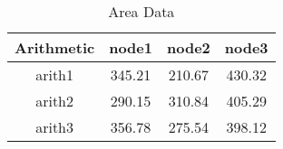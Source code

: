 \begin{table}[h]
\centering
\begin{tabular}{|c|c|c|c|}
\hline
Arithmetic & node1 & node2 & node3\\ \hline
arith1 & 345.21 & 210.67 & 430.32\\ \hline
arith2 & 290.15 & 310.84 & 405.29\\ \hline
arith3 & 356.78 & 275.54 & 398.12\\ \hline
\end{tabular}
\caption{Area Data}
\end{table}
